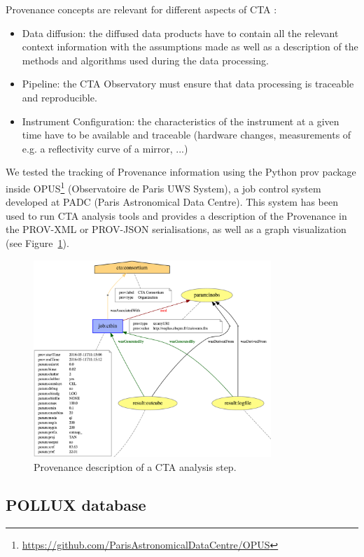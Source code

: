 Provenance concepts are relevant for different aspects of CTA :
\begin{itemize}
\item Data diffusion: the diffused data products have to contain all the relevant context information with the assumptions made as well as a description of the methods and algorithms used during the data processing.
\item Pipeline: the CTA Observatory must ensure that data processing is traceable and reproducible.
\item Instrument Configuration: the characteristics of the instrument at a given time have to be available and traceable (hardware changes, measurements of e.g. a reflectivity curve of a mirror, ...)
\end{itemize}

We tested the tracking of Provenance information using the Python prov package inside OPUS\footnote{\url{https://github.com/ParisAstronomicalDataCentre/OPUS}} (Observatoire de Paris UWS System), a job control system developed at PADC (Paris Astronomical Data Centre). This system has been used to run CTA analysis tools and provides a description of the Provenance in the PROV-XML or PROV-JSON serialisations, as well as a graph visualization (see Figure~\ref{fig:cta_prov}).

\begin{figure}
\centering
\includegraphics[width=0.8\textwidth]{CTA_prov.png}
\caption{Provenance description of a CTA analysis step.}
\label{fig:cta_prov}
\end{figure}


\subsection{POLLUX database}

